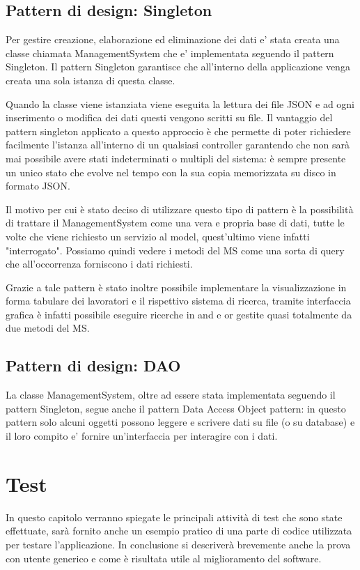 \documentclass[ 4paper,11pt,openany]{book}
\begin{document}
\section{Pattern di design: Singleton}
Per gestire creazione, elaborazione ed eliminazione dei dati e' stata creata una classe chiamata ManagementSystem che e' implementata seguendo il pattern Singleton.
Il pattern Singleton garantisce che all'interno della applicazione venga creata una sola istanza di questa classe.

Quando la classe viene istanziata viene eseguita la lettura dei file JSON e ad ogni inserimento o modifica dei dati questi vengono scritti su file.
Il vantaggio del pattern singleton applicato a questo approccio è che permette di poter richiedere facilmente l'istanza all'interno di un qualsiasi controller garantendo che non sarà mai possibile avere stati indeterminati o multipli del sistema: è sempre presente un unico stato che evolve nel tempo con la sua copia memorizzata su disco in formato JSON.

Il motivo per cui è stato deciso di utilizzare questo tipo di pattern è la possibilità di trattare il ManagementSystem come una vera e propria base di dati, tutte le volte che viene richiesto un servizio al model, quest'ultimo viene infatti "interrogato". Possiamo quindi vedere i metodi del MS come una sorta di query che all'occorrenza forniscono i dati richiesti.

Grazie a tale pattern è stato inoltre possibile implementare la visualizzazione in forma tabulare dei lavoratori e il rispettivo sistema di ricerca, tramite interfaccia grafica è infatti possibile eseguire ricerche in and e or gestite quasi totalmente da due metodi del MS.

\section{Pattern di design: DAO}
La classe ManagementSystem, oltre ad essere stata implementata seguendo il pattern Singleton, segue anche il pattern Data Access Object pattern: in questo pattern solo alcuni oggetti possono leggere e scrivere dati su file (o su database) e il loro compito e' fornire un'interfaccia per interagire con i dati.

\chapter{Test}
In questo capitolo verranno spiegate le principali attività di test che sono state effettuate, sarà fornito anche un esempio pratico di una parte di codice utilizzata per testare l'applicazione. In conclusione si descriverà brevemente anche la prova con utente generico e come è risultata utile al miglioramento del software. 
\end{document}
